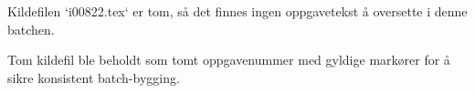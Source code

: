 

Kildefilen `i00822.tex` er tom, så det finnes ingen oppgavetekst å oversette i denne batchen.














Tom kildefil ble beholdt som tomt oppgavenummer med gyldige markører for å sikre konsistent batch-bygging.

